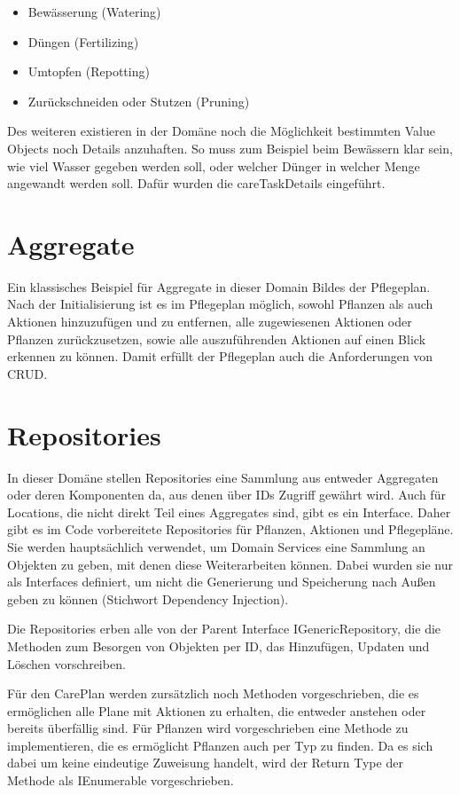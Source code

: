 \begin{itemize}
	\item Bewässerung (Watering)
	\item Düngen (Fertilizing)
	\item Umtopfen (Repotting)
	\item Zurückschneiden oder Stutzen (Pruning)
\end{itemize}

Des weiteren existieren in der Domäne noch die Möglichkeit bestimmten Value Objects noch Details anzuhaften. So muss zum Beispiel beim Bewässern klar sein, wie viel Wasser gegeben werden soll, oder welcher Dünger in welcher Menge angewandt werden soll. Dafür wurden die careTaskDetails eingeführt.

\section{Aggregate}
Ein klassisches Beispiel für Aggregate in dieser Domain Bildes der Pflegeplan. Nach der Initialisierung ist es im Pflegeplan möglich, sowohl Pflanzen als auch Aktionen hinzuzufügen und zu entfernen, alle zugewiesenen Aktionen oder Pflanzen zurückzusetzen, sowie alle auszuführenden Aktionen auf einen Blick erkennen zu können. Damit erfüllt der Pflegeplan auch die Anforderungen von CRUD.

\section{Repositories}
In dieser Domäne stellen Repositories eine Sammlung aus entweder Aggregaten oder deren Komponenten da, aus denen über IDs Zugriff gewährt wird. Auch für Locations, die nicht direkt Teil eines Aggregates sind, gibt es ein Interface. Daher gibt es im Code vorbereitete Repositories für Pflanzen, Aktionen und Pflegepläne. Sie werden hauptsächlich verwendet, um Domain Services eine Sammlung an Objekten zu geben, mit denen diese Weiterarbeiten können. Dabei wurden sie nur als Interfaces definiert, um nicht die Generierung und Speicherung nach Außen geben zu können (Stichwort Dependency Injection). 
\par
Die Repositories erben alle von der Parent Interface IGenericRepository, die die Methoden zum Besorgen von Objekten per ID, das Hinzufügen, Updaten und Löschen vorschreiben. 
\par
Für den CarePlan werden zursätzlich noch Methoden vorgeschrieben, die es ermöglichen alle Plane mit Aktionen zu erhalten, die entweder anstehen oder bereits überfällig sind. Für Pflanzen wird vorgeschrieben eine Methode zu implementieren, die es ermöglicht Pflanzen auch per Typ zu finden. Da es sich dabei um keine eindeutige Zuweisung handelt, wird der Return Type der Methode als IEnumerable vorgeschrieben.

